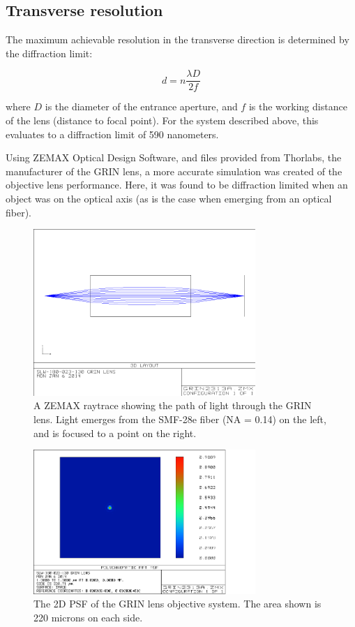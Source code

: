 
\subsection{Transverse resolution}

The maximum achievable resolution in the transverse direction is determined by the diffraction limit:

\begin{equation} \label{eq:tres2}
d = n\frac{\lambda D}{2f}
\end{equation}

where $D$ is the diameter of the entrance aperture, and $f$ is the working distance of the lens (distance to focal point). For the system described above, this evaluates to a diffraction limit of 590 nanometers.

Using ZEMAX Optical Design Software, and files provided from Thorlabs, the manufacturer of the GRIN lens, a more accurate simulation was created of the objective lens performance. Here, it was found to be diffraction limited when an object was on the optical axis (as is the case when emerging from an optical fiber).

\begin{figure}[h!]
\centering
\includegraphics[width=0.75\textwidth]{Images/Zemax/GRO-raytrace.png}
\caption{A ZEMAX raytrace showing the path of light through the GRIN lens. Light emerges from the SMF-28e fiber (NA = 0.14) on the left, and is focused to a point on the right.}
\end{figure}

\begin{figure}[h!]
\centering
\includegraphics[width=0.75\textwidth]{Images/Zemax/GRO-psf.png}
\caption{The 2D PSF of the GRIN lens objective system. The area shown is 220 microns on each side.}
\end{figure}

